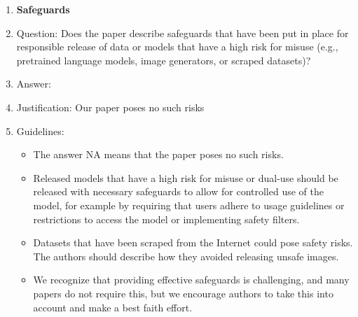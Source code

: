 \documentclass{article}
\theoremstyle{plain}
\theoremstyle{definition}
\theoremstyle{remark}
\begin{document}
\begin{enumerate}
\item {\bf Safeguards}
    \item[] Question: Does the paper describe safeguards that have been put in place for responsible release of data or models that have a high risk for misuse (e.g., pretrained language models, image generators, or scraped datasets)?
    \item[] Answer: \answerNA{} %
    \item[] Justification: Our paper poses no such risks
    \item[] Guidelines:
    \begin{itemize}
        \item The answer NA means that the paper poses no such risks.
        \item Released models that have a high risk for misuse or dual-use should be released with necessary safeguards to allow for controlled use of the model, for example by requiring that users adhere to usage guidelines or restrictions to access the model or implementing safety filters. 
        \item Datasets that have been scraped from the Internet could pose safety risks. The authors should describe how they avoided releasing unsafe images.
        \item We recognize that providing effective safeguards is challenging, and many papers do not require this, but we encourage authors to take this into account and make a best faith effort.
    \end{itemize}


\end{enumerate}
\end{document}

